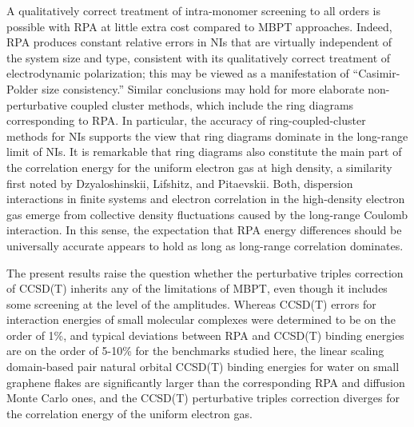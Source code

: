 \documentclass[journal=jctcce,manuscript=article]{achemso}
\providecommand{\DIFaddend}{} %
\DeclareRobustCommand{\DIFaddend}{\DIFOaddend \let\includegraphics\DIFOincludegraphics} %
\begin{document}
\DIFaddend A qualitatively correct treatment of intra-monomer
screening to all orders is possible with RPA at little extra cost
compared to MBPT approaches. Indeed, RPA produces
constant relative errors in NIs that are virtually independent of the system
size and type, consistent with its qualitatively correct treatment of
electrodynamic 
polarization; this may be viewed as a manifestation of ``Casimir-Polder
size consistency.''\cite{doi:10.1021/acs.jctc.7b00996}
Similar conclusions may hold for more elaborate 
non-perturbative coupled cluster methods, which include the ring
diagrams corresponding to RPA.\cite{doi:10.1063/1.3043729}
In particular, the accuracy of ring-coupled-cluster methods for
NIs\cite{doi:10.1063/1.3626551}
supports the view that ring diagrams dominate in the long-range limit
of NIs. It is remarkable that ring diagrams also constitute the main part
of the correlation energy for the uniform electron gas at high
density,\cite{PhysRev.106.364} 
a similarity first noted by Dzyaloshinskii, Lifshitz, and
Pitaevskii.\cite{Dzyaloshinskii1961165} Both, dispersion interactions in
finite systems and electron correlation in the high-density electron gas
emerge from collective density fluctuations\cite{PhysRev.82.625,PhysRev.85.338}
caused by the long-range Coulomb interaction. In this sense, the expectation
that RPA energy differences should be universally accurate\cite{PhysRevB.61.16430,PhysRevB.81.169902}
appears to hold as long as long-range correlation dominates. 

The present results raise the question whether the perturbative triples
correction of CCSD(T) inherits any of the limitations of MBPT, even though it
includes some screening at the level of the amplitudes. Whereas CCSD(T)
errors for interaction energies of small molecular complexes were determined
to be on the order of 1\%,\cite{doi:10.1021/ct400036b} and typical deviations
between RPA and CCSD(T) binding energies are on the order of 5-10\% for
the benchmarks studied here, the linear scaling domain-based pair natural
orbital CCSD(T) binding energies for water on small graphene flakes are
significantly larger than the corresponding RPA and diffusion Monte Carlo
ones,\cite{doi:10.1021/acs.jctc.9b00110} and the CCSD(T) perturbative triples
correction diverges for the correlation energy of the uniform electron
gas.\cite{PhysRevLett.110.226401}
\end{document}
